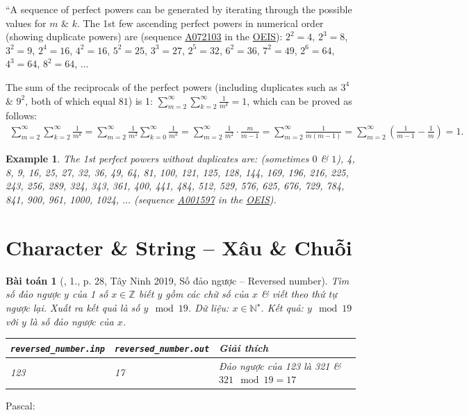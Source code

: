 \documentclass{article}
\newtheorem{baitoan}{Bài toán}
\newtheorem{example}{Example}
\begin{document}
``A sequence of perfect powers can be generated by iterating through the possible values for $m$ \& $k$. The 1st few ascending perfect powers in numerical order (showing duplicate powers) are (sequence \href{https://oeis.org/A072103}{A072103} in the \href{https://en.wikipedia.org/wiki/On-Line_Encyclopedia_of_Integer_Sequences}{OEIS}): $2^2 = 4$, $2^3 = 8$, $3^2 = 9$, $2^4 = 16$, $4^2 = 16$, $5^2 = 25$, $3^3 = 27$, $2^5 = 32$, $6^2 = 36$, $7^2 = 49$, $2^6 = 64$, $4^3 = 64$, $8^2 = 64$, $\ldots$

The sum of the reciprocals of the perfect powers (including duplicates such as $3^4$ \& $9^2$, both of which equal $81$) is 1: $\sum_{m=2}^\infty\sum_{k=2}^\infty \frac{1}{m^k} = 1$, which can be proved as follows:
\begin{align*}
	\sum_{m=2}^\infty\sum_{k=2}^\infty \frac{1}{m^k} = \sum_{m=2}^\infty \frac{1}{m^2}\sum_{k=0}^\infty \frac{1}{m^k} = \sum_{m=2}^\infty \frac{1}{m^2}\cdot\frac{m}{m - 1} = \sum_{m=2}^\infty \frac{1}{m(m - 1)} = \sum_{m=2}^\infty \left(\frac{1}{m - 1} - \frac{1}{m}\right) = 1.
\end{align*}

\begin{example}
	The 1st perfect powers without duplicates are: (sometimes $0$ \& $1$), \emph{4, 8, 9, 16, 25, 27, 32, 36, 49, 64, 81, 100, 121, 125, 128, 144, 169, 196, 216, 225, 243, 256, 289, 324, 343, 361, 400, 441, 484, 512, 529, 576, 625, 676, 729, 784, 841, 900, 961, 1000, 1024}, $\ldots$ (sequence \href{https://oeis.org/A001597}{A001597} in the \href{https://en.wikipedia.org/wiki/On-Line_Encyclopedia_of_Integer_Sequences}{OEIS}).
\end{example}


\section{Character \& String -- Xâu \& Chuỗi}

\begin{baitoan}[\cite{VietSTEM2021}, 1., p. 28, Tây Ninh 2019, Số đảo ngược -- Reversed number]
	Tìm số đảo ngược $y$ của 1 số $x\in\mathbb{Z}$ biết $y$ gồm các chữ số của $x$ \& viết theo thứ tự ngược lại. Xuất ra kết quả là số $y\mod19$. {\sf Dữ liệu:} $x\in\mathbb{N}^\star$. {\sf Kết quả:} $y\mod19$ với $y$ là số đảo ngược của $x$.
	\begin{table}[H]
		\centering
		\begin{tabular}{|l|l|l|}
			\hline
			\verb|reversed_number.inp| & \verb|reversed_number.out| & Giải thích \\
			\hline
			123 & 17 & Đảo ngược của 123 là 321 \& $321\mod19 = 17$ \\
			\hline
		\end{tabular}
	\end{table}
\end{baitoan}
\noindent Pascal:
\end{document}
